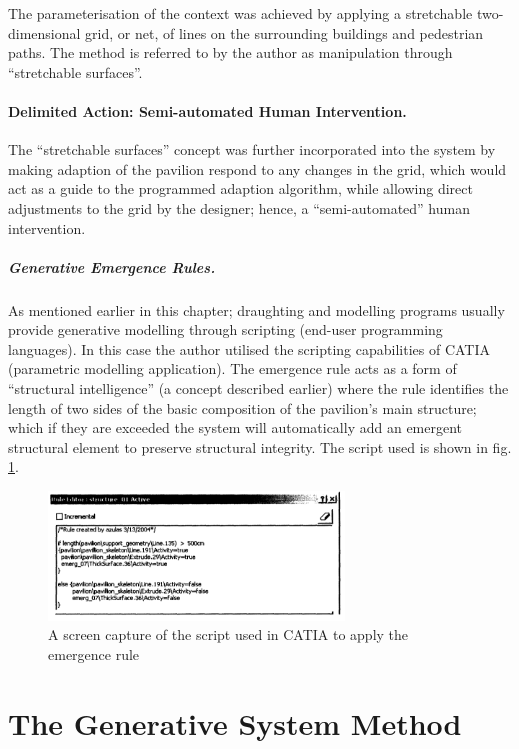 The parameterisation of the context was achieved by applying a stretchable two-dimensional grid, or net, of lines on the surrounding buildings and pedestrian paths. The method is referred to by the author as manipulation through ``stretchable surfaces''.

\paragraph{Delimited Action: Semi-automated Human Intervention.}\mbox{}
The ``stretchable surfaces'' concept was further incorporated into the system by making adaption of the pavilion respond to any changes in the grid, which would act as a guide to the programmed adaption algorithm, while allowing direct adjustments to the grid by the designer; hence, a ``semi-automated'' human intervention.

\subparagraph{Generative Emergence Rules.} As mentioned earlier in this chapter; draughting and modelling programs usually provide generative modelling through scripting (end-user programming languages). In this case the author \cite{zulas04} utilised the scripting capabilities of CATIA (parametric modelling application). The emergence rule acts as a form of ``structural intelligence'' (a concept described earlier) where the rule identifies the length of two sides of the basic composition of the pavilion's main structure; which if they are exceeded the system will automatically add an emergent structural element to preserve structural integrity. The script used is shown in fig. \ref{fig:EmergRuleScr}.

\begin{figure}[htbp]
\centering
\includegraphics[width=0.7\textwidth]{./Images/14-EmergRuleScr}
\caption[Emergence Rule Script]{A screen capture of the script used in CATIA to apply the emergence rule \cite{zulas04}}
\label{fig:EmergRuleScr}
\end{figure}

\clearpage
\section{The Generative System Method}
\label{sec:GSM}


